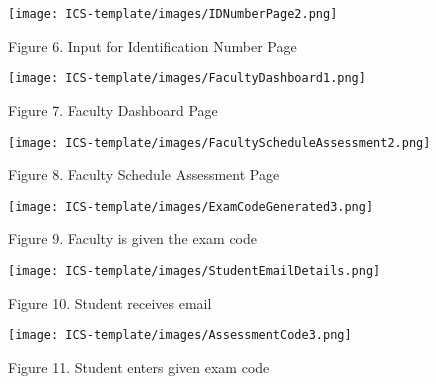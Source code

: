 \documentclass{icsthesis}
\begin{document}
\begin{mainmatter}
\begin{figure}[h]
    \centering
    \texttt{[image: ICS-template/images/IDNumberPage2.png]}
    \newline
    \captionsetup{labelformat=empty}
    \caption{Figure 6. Input for Identification Number Page}
    \label{Figure 6: Input for Identification Number Page}
\end{figure}

\begin{figure}[h]
    \centering
    \texttt{[image: ICS-template/images/FacultyDashboard1.png]}
    \newline
    \captionsetup{labelformat=empty}
    \caption{Figure 7. Faculty Dashboard Page}
    \label{Figure 7: Faculty Dashboard Page}
\end{figure}

\begin{figure}[h]
    \centering
    \texttt{[image: ICS-template/images/FacultyScheduleAssessment2.png]}
    \newline
    \captionsetup{labelformat=empty}
    \caption{Figure 8. Faculty Schedule Assessment Page}
    \label{Figure 8: Faculty Schedule Assessment Page}
\end{figure}

\begin{figure}[h]
    \centering
    \texttt{[image: ICS-template/images/ExamCodeGenerated3.png]}
    \newline
    \captionsetup{labelformat=empty}
    \caption{Figure 9. Faculty is given the exam code}
    \label{Figure 9: Faculty is given the exam codel}
\end{figure}

\begin{figure}[h]
    \centering
    \texttt{[image: ICS-template/images/StudentEmailDetails.png]}
    \newline
    \captionsetup{labelformat=empty}
    \caption{Figure 10. Student receives email}
    \label{Figure 10: Student receives email}
\end{figure}

\begin{figure}[h]
    \centering
    \texttt{[image: ICS-template/images/AssessmentCode3.png]}
    \newline
    \captionsetup{labelformat=empty}
    \caption{Figure 11. Student enters given exam code}
    \label{Figure 11: Student enters given exam code}
\end{figure}


\end{mainmatter}
\end{document}
